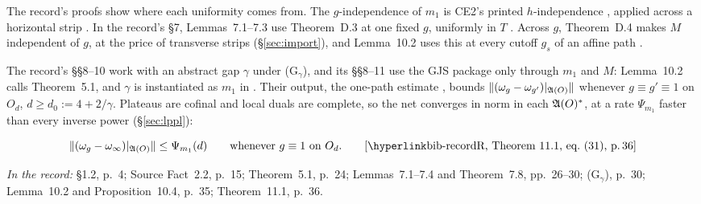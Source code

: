 The record's proofs show where each uniformity comes from. The $g$-independence of $m_1$
is CE2's printed $h$-independence , applied across a horizontal
strip . In the record's \S7, Lemmas~7.1--7.3 use Theorem~D.3 at one
fixed $g$, uniformly in $T$ . Across $g$, Theorem~D.4
makes $M$ independent of $g$, at the price of transverse strips (\S\ref{sec:import}), and
Lemma~10.2 uses this at every cutoff $g_s$ of an affine path .

The record's \S\S8--10 work with an abstract gap $\gamma$ under (G$_\gamma$), and its
\S\S8--11 use the GJS package only through $m_1$ and $M$: Lemma~10.2 calls
Theorem~5.1, and $\gamma$ is instantiated as $m_1$ in . Their output,
the one-path estimate , bounds
$\|(\omega_g-\omega_{g'})|_{\mathfrak{A}(O)}\|$ whenever $g\equiv g'\equiv1$ on $O_d$,
$d\ge d_0:=4+2/\gamma$. Plateaus are cofinal and local duals are complete, so the net
converges in norm in each $\mathfrak{A}(O)^*$, at a rate $\Psi_{m_1}$ faster than every inverse
power (\S\ref{sec:lppl}):
\begin{checkpoint}
\begin{equation*}
 \|(\omega_g-\omega_\infty)|_{\A(O)}\|\le\Psi_{m_1}(d)
 \qquad\text{whenever }g\equiv1\text{ on }O_d .
 \tag*{\rec{Theorem~11.1, eq.~(31)}{36}}
\end{equation*}
\end{checkpoint}

\noindent\emph{In the record:} \S1.2, p.~4; Source Fact~2.2, p.~15; Theorem~5.1, p.~24;
Lemmas~7.1--7.4 and Theorem~7.8, pp.~26--30; (G$_\gamma$), p.~30; Lemma~10.2 and
Proposition~10.4, p.~35; Theorem~11.1, p.~36.
